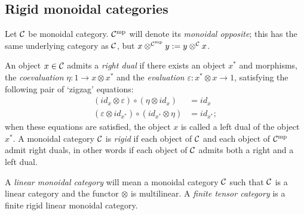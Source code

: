 \documentclass{amsart}
\begin{document}
\subsection{Rigid monoidal categories}


Let $\mathcal C$ be monoidal category. $\mathcal C^{\mathrm{mp}}$ will denote its {\em monoidal opposite}; this has the same underlying category as $\mathcal C$, but $x \otimes^{\mathcal C^{\mathrm{mp}}} y : = y \otimes^{\mathcal C} x$. 

\begin{definition} \label{def:rigid}
	An object $x \in \mathcal C$ admits a {\em right dual} if there exists an object $x^*$ and morphisms, the {\em coevaluation} $\eta: 1 \to x \otimes x^*$ and the {\em evaluation} $\varepsilon: x^* \otimes x \to 1$, satisfying the following pair of `zigzag' equations:
	\begin{align*}
		(id_{x} \otimes \varepsilon  ) \circ (  \eta \otimes id_{x}) &= id_{x} \\
		(\varepsilon \otimes id_{x^*}) \circ (id_{x^*} \otimes \eta) &= id_{x^*};
	\end{align*}
	when these equations are satisfied, the object $x$ is called a left dual of the object $x^*$.  A monoidal category $\mathcal C$ is {\em rigid} if each object of $\mathcal C$ and each object of $\mathcal C^{\mathrm{mp}}$ admit right duals, in other words if each object of $\mathcal C$ admits both a right and a left dual. 
\end{definition}



\begin{definition}
	A {\em linear monoidal category} will mean a monoidal category $\mathcal C$ such that $\mathcal C$ is a linear category and the functor $\otimes$ is multilinear. A {\em finite tensor category} is a finite rigid linear monoidal category.    
\end{definition}
\end{document}
